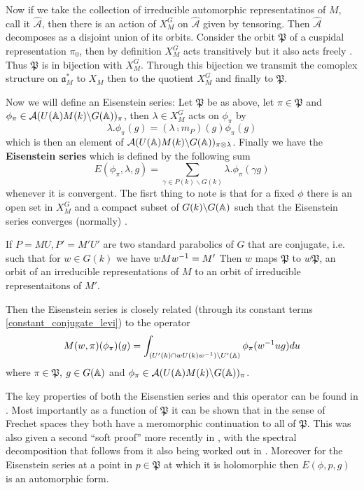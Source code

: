 Now if we take the collection of irreducible automorphic representatinos of \(M\), call it \(\hat{\mathcal{A}}\), then there is an action of \(X_M^G\) on \(\hat{\mathcal{A}}\) given by tensoring. Then \(\hat{\mathcal{A}}\) decomposes as a disjoint union of its orbits. Consider the orbit \(\mathfrak{P}\) of a cuspidal representation \(\pi_0\), then by definition \(X_M^G\) acts transitively but it also acts freely \cite[II.1]{moeglinSpectralDecompositionEisenstein1995}. Thus \(\mathfrak{P}\) is in bijection with \(X_M^G\). Through this bijection we transmit the comoplex structure on \(\mathfrak{a}_M^*\) to \(X_M\) then to the quotient \(X_M^G\) and finally to \(\mathfrak{P}\).

Now we will define an Eisenstein series: Let \(\mathfrak{P}\) be as above, let \(\pi\in \mathfrak{P}\) and \(\phi_\pi \in \mathcal{A}(U(\A)M(k)\backslash G(\A))_\pi\), then \(\lambda\in X_M^G\) acts on \(\phi_\pi\) by 
\[\lambda.\phi_\pi(g) = (\lambda \comp m_P)(g) \phi_\pi(g)\]
which is then an element of \(\mathcal{A}(U(\A)M(k)\backslash G(\A))_{\pi\tensor \lambda}\). Finally we have the \textbf{Eisenstein series} which is defined by the following sum
\[E(\phi_\pi, \lambda, g) = \sum_{\gamma \in P(k)\backslash G(k)} \lambda.\phi_\pi(\gamma g)\]
whenever it is convergent. The fisrt thing to note is that for a fixed \(\phi\) there is an open set in \(X_M^G\) and a compact subset of \(G(k)\backslash G(\A)\) such that the Eisenstein series converges (normally) \cite[II.1.5]{moeglinSpectralDecompositionEisenstein1995}.

If \(P = MU, P' = M'U'\) are two standard parabolics of \(G\) that are conjugate, i.e. such that for \(w\in G(k)\) we have \(wMw^{-1} = M'\)
Then \(w\) maps \(\mathfrak{P}\) to \(w\mathfrak{P}\), an orbit of an irreducible representations of \(M\) to an orbit of irreducible representaitons of \(M'\).

Then the Eisenstein series is closely related (through its constant terms \ref{constant_conjugate_levi}) to the operator
\[M(w, \pi)(\phi_\pi)(g) = \int_{(U'(k)\cap wU(k)w\inv )\backslash U'(\A)} \phi_\pi(w\inv ug) du\]
where \(\pi\in \mathfrak{P}\), \(g\in G(\A)\) and \(\phi_\pi \in \mathcal{A}(U(\A)M(k)\backslash G(\A))_\pi\).

The key properties of both the Eisenstien series and this operator can be found in \cite[IV.1.8, IV.1.9, IV.1.10, IV.1.11]{moeglinSpectralDecompositionEisenstein1995}. Most importantly as a function of \(\mathfrak{P}\) it can be shown that in the sense of Frechet spaces they both have a meromorphic continuation to all of \(\mathfrak{P}\). This was also given a second ``soft proof'' more recently in \cite{bernsteinMeromorphicContinuationEisenstein2022}, with the spectral decomposition that follows from it also being worked out in \cite{delormeSpectralTheoremLanglands2021}. Moreover for the Eisenstein series at a point in \(p\in \mathfrak{P}\) at which it is holomorphic then \(E(\phi,p, g)\) is an automorphic form. 

